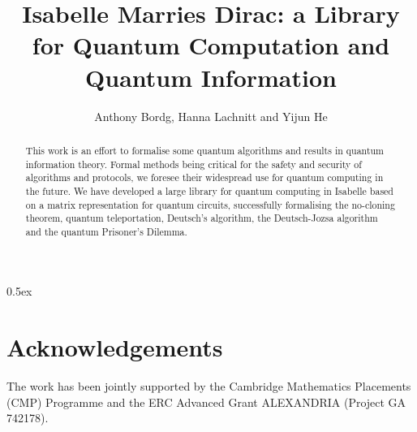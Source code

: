 \documentclass[11pt,a4paper]{article}
\begin{document}
\title{Isabelle Marries Dirac: a Library for Quantum Computation and Quantum Information}
\author{Anthony Bordg, Hanna Lachnitt and Yijun He}
\maketitle

\tableofcontents

\begin{abstract}
This work is an effort to formalise some quantum algorithms and results in quantum information theory. Formal methods being critical for the safety and security of algorithms and protocols, we foresee their widespread use for quantum computing in the future. We have developed a large library for quantum computing in Isabelle based on a matrix representation for quantum circuits, successfully formalising the no-cloning theorem, quantum teleportation, Deutsch's algorithm, the Deutsch-Jozsa algorithm and the quantum Prisoner's Dilemma.
\end{abstract}


\parindent 0pt\parskip 0.5ex



\section{Acknowledgements}

The work has been jointly supported by the Cambridge Mathematics Placements (CMP) 
Programme and the ERC Advanced Grant ALEXANDRIA (Project GA 742178).

\nocite{*}


\end{document}
